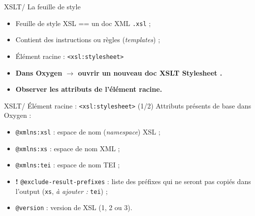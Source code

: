 \documentclass{beamer}
\begin{document}
    \begin{frame}{XSLT/ La feuille de style}
    \Large
        \begin{itemize}
            \item Feuille de style XSL == un doc XML \texttt{.xsl} ;
            \item Contient des instructions ou règles (\textit{templates})  ;
            \item Élément racine : \texttt{<xsl:stylesheet>}
        \end{itemize}
        \bigskip
        \bigskip
        \begin{itemize}
            \item \textbf{Dans Oxygen $\rightarrow$ ouvrir un nouveau doc \og XSLT Stylesheet \fg.}
            \item \textbf{Observer les attributs de l'élément racine.}
        \end{itemize}
    \end{frame}

    \begin{frame}{XSLT/ Élément racine : \texttt{<xsl:stylesheet>} (1/2)}
    \Large
    Attributs présents de base dans Oxygen :
        \begin{itemize}
            \item \texttt{@xmlns:xsl} : espace de nom (\textit{namespace}) XSL ;
            \item \texttt{@xmlns:xs} : espace de nom XML ;
            \item \texttt{@xmlns:tei} : espace de nom TEI ;
            \item \textbf{!} \texttt{@exclude-result-prefixes} : liste des préfixes qui ne seront pas copiés dans l'output (\texttt{xs}, \textit{à ajouter :} \texttt{tei}) ;
            \item \texttt{@version} : version de XSL (1, 2 ou 3).
        \end{itemize}
    \end{frame}
\end{document}
